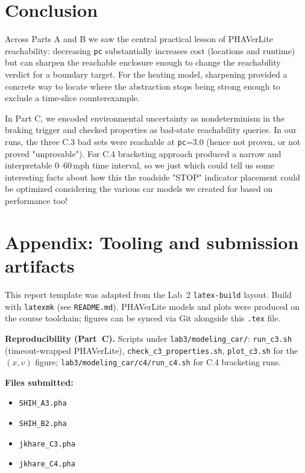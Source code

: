\documentclass[10pt]{article}
\begin{document}
\section*{Conclusion}
Across Parts A and B we saw the central practical lesson of PHAVerLite reachability: decreasing \texttt{pc} substantially increases cost (locations and runtime) but can sharpen the reachable enclosure enough to change the reachability verdict for a boundary target. For the heating model, sharpening provided a concrete way to locate where the abstraction stops being strong enough to exclude a time-slice counterexample.

\noindent In Part C, we encoded environmental uncertainty as nondeterminism in the braking trigger and checked properties as bad-state reachability queries. In our runs, the three C.3 bad sets were reachable at \texttt{pc}=3.0 (hence not proven, or not proved "unprovable"). For C.4 bracketing approach produced a narrow and interpretable 0--60\,mph time interval, so we just which could tell us some interesting facts about how this the roadside "STOP" indicator placement could be optimized considering the various car models we created for based on performance too!

\appendix
\section*{Appendix: Tooling and submission artifacts}
This report template was adapted from the Lab~2 \texttt{latex-build} layout. Build with \texttt{latexmk} (see \texttt{README.md}). PHAVerLite models and plots were produced on the course toolchain; figures can be synced via Git alongside this \texttt{.tex} file.

\textbf{Reproducibility (Part~C).} Scripts under \texttt{lab3/modeling\_car/}: \texttt{run\_c3.sh} (timeout-wrapped PHAVerLite), \texttt{check\_c3\_properties.sh}, \texttt{plot\_c3.sh} for the $(x,v)$ figure; \texttt{lab3/modeling\_car/c4/run\_c4.sh} for C.4 bracketing runs.

\textbf{Files submitted:}
\begin{itemize}
  \item \texttt{SHIH\_A3.pha}
  \item \texttt{SHIH\_B2.pha}
  \item \texttt{jkhare\_C3.pha}
  \item \texttt{jkhare\_C4.pha}
\end{itemize}



\end{document}
